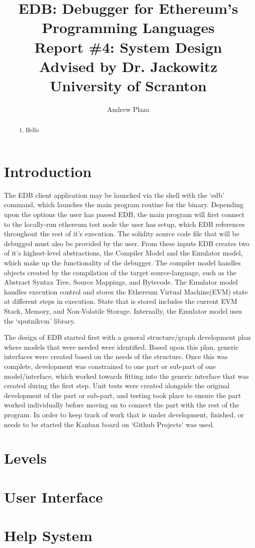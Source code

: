 \documentclass{report}
\title{%
    EDB: Debugger for Ethereum's Programming Languages \\
	\medskip
	\large Report \#4: System Design \\
    \large Advised by Dr. Jackowitz	\\
	\large University of Scranton}
\author{Andrew Plaza}
\begin{document}
\maketitle
\newpage

\begin{abstract}
    \begin{enumerate}
        \item Hello
    \end{enumerate}
\end{abstract}

\tableofcontents
\newpage

\section{Introduction}
    The EDB client application may be launched via the shell with the `edb' command, which launches the main program routine for the binary. Depending upon the options the user has passed EDB, the main program will first connect to the locally-run ethereum test node the user has setup, which EDB references throughout the rest of it's execution. The solidity source code file that will be debugged must also be provided by the user. From these inputs EDB creates two of it's highest-level abstractions, the Compiler Model and the Emulator model, which make up the functionality of the debugger. The compiler model handles objects created by the compilation of the target source-language, such as the Abstract Syntax Tree, Source Mappings, and Bytecode. The Emulator model handles execution control and stores the Ethereum Virtual Machine(EVM) state at different steps in execution. State that is stored includes the current EVM Stack, Memory, and Non-Volatile Storage. Internally, the Emulator model uses the `sputnikvm' library.

    The design of EDB started first with a general structure/graph development plan where models that were needed were identified. Based upon this plan, generic interfaces were created based on the needs of the structure. Once this was complete, development was constrained to one part or sub-part of one model/interface, which worked towards fitting into the generic interface that was created during the first step. Unit tests were created alongside the original development of the part or sub-part, and testing took place to ensure the part worked individually before moving on to connect the part with the rest of the program. In order to keep track of work that is under development, finished, or needs to be started the Kanban board on `Github Projects' was used.

\section{Levels}
\section{User Interface}
\section{Help System}

\section{}
\end{document}
